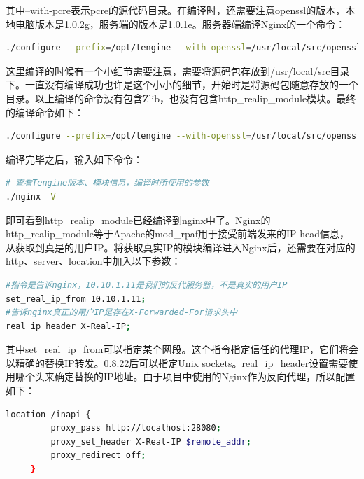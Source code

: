 \documentclass[letter]{book}
\begin{document}
其中--with-pcre表示pcre的源代码目录。在编译时，还需要注意openssl的版本，本地电脑版本是1.0.2g，服务端的版本是1.0.1e。服务器端编译Nginx的一个命令：

\begin{lstlisting}[language=bash]
./configure --prefix=/opt/tengine --with-openssl=/usr/local/src/openssl-OpenSSL_1_0_2g/ --without-http_gzip_module --with-pcre=/usr/local/src/pcre-8.40/
\end{lstlisting}

这里编译的时候有一个小细节需要注意，需要将源码包存放到/usr/local/src目录下。一直没有编译成功也许是这个小小的细节，开始时是将源码包随意存放的一个目录。以上编译的命令没有包含Zlib，也没有包含http\_realip\_module模块。最终的编译命令如下：

\begin{lstlisting}[language=bash]
./configure --prefix=/opt/tengine --with-openssl=/usr/local/src/openssl-OpenSSL_1_0_2g/ --without-http_gzip_module --with-pcre=/usr/local/src/pcre-8.40/ --with-zlib=/usr/local/src/zlib-1.2.11 --with-http_realip_module 
\end{lstlisting}

编译完毕之后，输入如下命令：

\begin{lstlisting}[language=bash]
# 查看Tengine版本、模块信息，编译时所使用的参数
./nginx -V
\end{lstlisting}

即可看到http\_realip\_module已经编译到nginx中了。Nginx的http\_realip\_module等于Apache的mod\_rpaf用于接受前端发来的IP head信息，从获取到真是的用户IP。将获取真实IP的模块编译进入Nginx后，还需要在对应的http、server、location中加入以下参数：

\begin{lstlisting}[language=bash]
#指令是告诉nginx，10.10.1.11是我们的反代服务器，不是真实的用户IP
set_real_ip_from 10.10.1.11;
#告诉nginx真正的用户IP是存在X-Forwarded-For请求头中
real_ip_header X-Real-IP;
\end{lstlisting}

其中set\_real\_ip\_from可以指定某个网段。这个指令指定信任的代理IP，它们将会以精确的替换IP转发。0.8.22后可以指定Unix sockets。real\_ip\_header设置需要使用哪个头来确定替换的IP地址。由于项目中使用的Nginx作为反向代理，所以配置如下：

\begin{lstlisting}[language=bash]
location /inapi {
         proxy_pass http://localhost:28080;
         proxy_set_header X-Real-IP $remote_addr;
         proxy_redirect off;
     }
\end{lstlisting}
\end{document}
